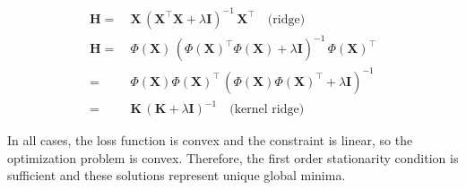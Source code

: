 \documentclass[utf8]{frontiersSCNS} %
\renewcommand{\b}{\boldsymbol{\beta}} %
\renewcommand{\H}{\mathbf{H}}
\newcommand{\I}{\mathbf{I}}
\newcommand{\K}{\mathbf{K}}
\newcommand{\X}{\mathbf{X}}
\newcommand{\y}{\mathbf{y}}
\newcommand{\yh}{\mathbf{\hat{y}}}
\newcommand{\yt}{\mathbf{\widetilde{y}}}
\begin{document}
\begin{equation*}
\begin{split}
\H =&\ \X\,(\X^\top\X + \lambda\I)^{-1}\,\X^\top\quad\text{(ridge)}\\
\H =&\ \Phi(\X)\,(\Phi(\X)^\top\Phi(\X) + \lambda\I)^{-1}\,\Phi(\X)^\top\\
=&\ \Phi(\X)\Phi(\X)^\top\,(\Phi(\X)\Phi(\X)^\top + \lambda\I)^{-1}\\
=&\ \K\,(\K + \lambda\I)^{-1}\quad\text{(kernel ridge)}
\end{split}
\end{equation*}


In all cases, the loss function is convex and the constraint is linear, so the optimization problem is convex. Therefore, the first order stationarity condition is sufficient and these solutions represent unique global minima.







\end{document}
